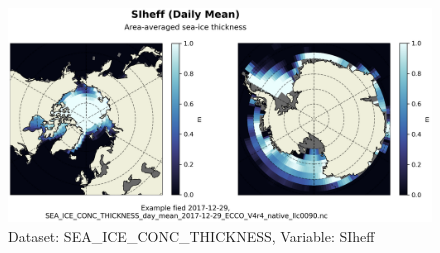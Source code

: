 \begin{figure}[H]
\centering
\includegraphics[scale=0.55]{../images/plots/native_plots/Sea-Ice_and_Snow_Concentration_and_Thickness/SIheff.png}
\caption{Dataset: SEA\_ICE\_CONC\_THICKNESS, Variable: SIheff}
\label{tab:table-SEA_ICE_CONC_THICKNESS_SIheff-Plot}
\end{figure}
\pagebreak
